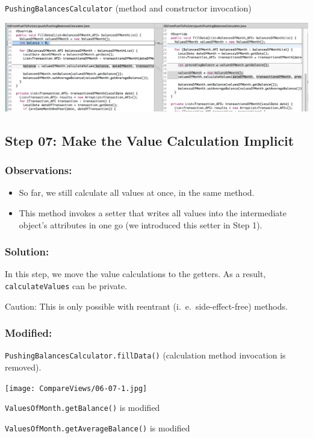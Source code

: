 \documentclass[a4paper,fleqn,titlepage,11pt]{article}
\begin{document}
\texttt{PushingBalancesCalculator} (method and constructor invocation)

\includegraphics[width=1\textwidth]{CompareViews/05-06-1.png}




\subsection*{Step 07: Make the Value Calculation Implicit}

\subsubsection*{Observations:}
\begin{itemize}
\item So far, we still calculate all values at once, in the same method. 
\item This method invokes a setter that writes all values into the intermediate object's attributes in one go (we introduced this setter in Step 1).
\end{itemize}

\subsubsection*{Solution:}
In this step, we move the value calculations to the getters. As a result, \texttt{calculateValues} can be private.

Caution: This is only possible with reentrant (i.~e.~side-effect-free) methods.

\subsubsection*{Modified:}

\texttt{PushingBalancesCalculator.fillData()} (calculation method invocation is removed).

\texttt{[image: CompareViews/06-07-1.jpg]}

\texttt{ValuesOfMonth.getBalance()} is modified

\texttt{ValuesOfMonth.getAverageBalance()} is modified
\end{document}
